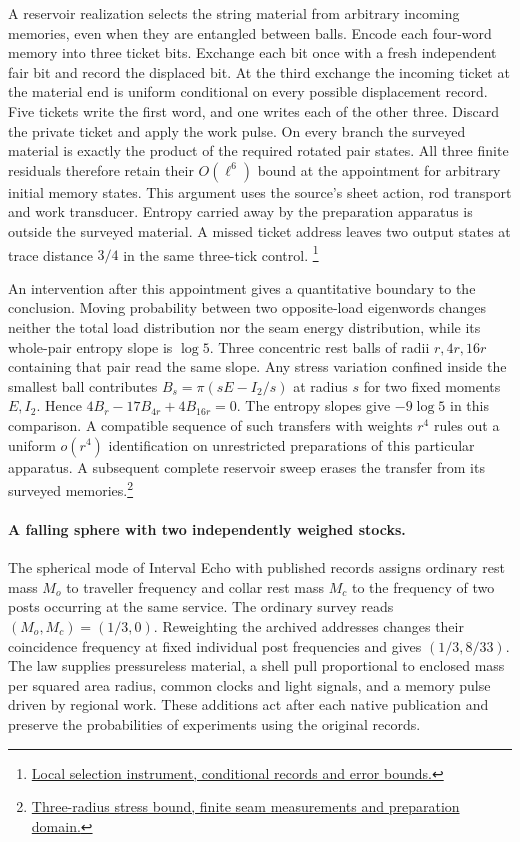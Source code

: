 \documentclass[11pt]{article}
\begin{document}
A reservoir realization selects the string material from arbitrary
incoming memories, even when they are entangled between balls. Encode
each four-word memory into three ticket bits. Exchange each bit once
with a fresh independent fair bit and record the displaced bit. At the
third exchange the incoming ticket at the material end is uniform
conditional on every possible displacement record. Five tickets write
the first word, and one writes each of the other three. Discard the
private ticket and apply the work pulse. On every branch the surveyed
material is exactly the product of the required rotated pair states.
All three finite residuals therefore retain their $O(\ell^6)$ bound
at the appointment for arbitrary initial memory states. This argument
uses the source's sheet action, rod transport and work transducer.
Entropy carried away by the preparation apparatus is outside the
surveyed material. A missed ticket address leaves two output states
at trace distance $3/4$ in the same three-tick control.
\footnote{\href{https://github.com/FloatingPragma/observer-patch-holography/tree/main/model/candidate_laws/interval_echo_partition_repair/published_strings/nested_stress/selection}{Local selection instrument, conditional records and error bounds.}}

An intervention after this appointment gives a quantitative boundary
to the conclusion. Moving probability between two opposite-load
eigenwords changes neither the total load distribution nor the seam
energy distribution, while its whole-pair entropy slope is $\log 5$.
Three concentric rest balls of radii $r,4r,16r$ containing that pair
read the same slope. Any stress variation confined inside the smallest
ball contributes $B_s=\pi(sE-I_2/s)$ at radius $s$ for two fixed
moments $E,I_2$. Hence $4B_r-17B_{4r}+4B_{16r}=0$. The entropy slopes
give $-9\log 5$ in this comparison. A compatible sequence of such
transfers with weights $r^4$ rules out a uniform $o(r^4)$ identification
on unrestricted preparations of this particular apparatus. A subsequent
complete reservoir sweep erases the transfer from its surveyed
memories.\footnote{\href{https://github.com/FloatingPragma/observer-patch-holography/tree/main/model/candidate_laws/interval_echo_partition_repair/published_strings/nested_stress}{Three-radius stress bound, finite seam measurements and preparation domain.}}

\paragraph{A falling sphere with two independently weighed stocks.}
The spherical mode of Interval Echo with published records assigns
ordinary rest mass $M_o$ to traveller frequency and collar rest mass
$M_c$ to the frequency of two posts occurring at the same service.
The ordinary survey reads $(M_o,M_c)=(1/3,0)$. Reweighting the
archived addresses changes their coincidence frequency at fixed
individual post frequencies and gives $(1/3,8/33)$.
The law supplies pressureless material, a shell pull proportional to
enclosed mass per squared area radius, common clocks and light signals,
and a memory pulse driven by regional work. These additions act after
each native publication and preserve the probabilities of experiments
using the original records.
\end{document}
